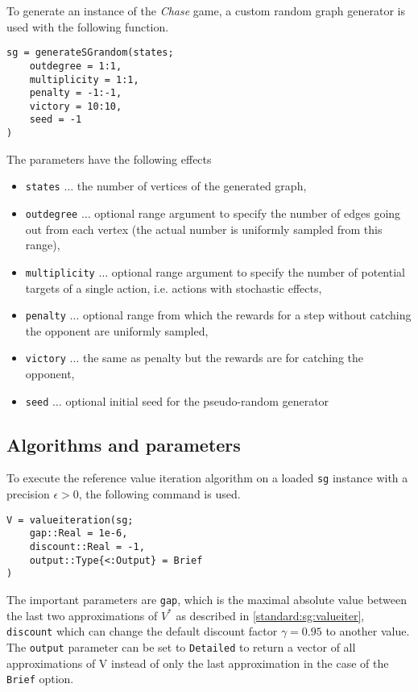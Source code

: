 \documentclass[../main.tex]{subfiles}
\begin{document}
To generate an instance of the \textit{Chase} game, a custom random graph generator is used with the following function.
\begin{lstlisting}
sg = generateSGrandom(states;
    outdegree = 1:1,
    multiplicity = 1:1,
    penalty = -1:-1,
    victory = 10:10,
    seed = -1
)
\end{lstlisting}
The parameters have the following effects
\begin{itemize}
    \item \texttt{states} $\dots$ the number of vertices of the generated graph,
    \item \texttt{outdegree} $\dots$ optional range argument to specify the number of edges going out from each vertex (the actual number is uniformly sampled from this range),
    \item \texttt{multiplicity} $\dots$ optional range argument to specify the number of potential targets of a single action, i.e. actions with stochastic effects,
    \item \texttt{penalty} $\dots$ optional range from which the rewards for a step without catching the opponent are uniformly sampled,
    \item \texttt{victory} $\dots$ the same as penalty but the rewards are for catching the opponent,
    \item \texttt{seed} $\dots$ optional initial seed for the pseudo-random generator
\end{itemize}

\subsection{Algorithms and parameters}
To execute the reference value iteration algorithm on a loaded \texttt{sg} instance with a precision $\epsilon > 0$, the following command is used.
\begin{lstlisting}
V = valueiteration(sg;
    gap::Real = 1e-6,
    discount::Real = -1,
    output::Type{<:Output} = Brief
)
\end{lstlisting}
The important parameters are \texttt{gap}, which is the maximal absolute value between the last two approximations of $V^*$ as described in \ref{standard:sg:valueiter}, \texttt{discount} which can change the default discount factor $\gamma = 0.95$ to another value.
The \texttt{output} parameter can be set to \texttt{Detailed} to return a vector of all approximations of V instead of only the last approximation in the case of the \texttt{Brief} option.
\end{document}
